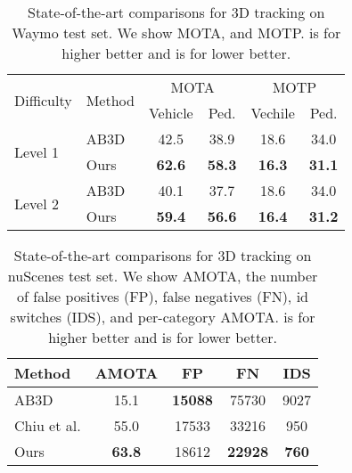 \documentclass[final]{cvpr}
\begin{document}
\begin{table}[t]
\small
\begin{center}
\begin{tabular}{@{}l@{\ \ \ }l@{\ \ \ }c@{\ \ \ }c@{\ \ \ }c@{\ \ \ }c@{}}
  \toprule
  \multirow{2}{4em}{Difficulty} & \multirow{2}{3em}{Method} &  \multicolumn{2}{c}{MOTA} & \multicolumn{2}{c}{MOTP} \\ 
  & & Vehicle & Ped. & Vechile & Ped.  \\ 
   \midrule 
   \multirow{2}{3em}{Level 1} 
   & AB3D~\cite{weng2019baseline, sun2019scalability} & 42.5  & 38.9 & 18.6 & 34.0  \\
   & Ours &  \textbf{62.6} & \textbf{58.3} & \textbf{16.3} & \textbf{31.1} \\ 
  \midrule 
  \multirow{2}{3em}{Level 2} 
  & AB3D~\cite{weng2019baseline, sun2019scalability} & 40.1 & 37.7 & 18.6 & 34.0  \\ 
  & Ours & \textbf{59.4} & \textbf{56.6} & \textbf{16.4} & \textbf{31.2} \\ 
  \bottomrule
\end{tabular}
\end{center}
\vspace{-5mm}
\caption{State-of-the-art comparisons for 3D tracking on Waymo test set. We show MOTA, and MOTP.  is for higher better and  is for lower better.}
\end{table}

\begin{table}[t]
\small
\begin{center}
\begin{tabular}{lcccc}
  \toprule
  Method & AMOTA & FP & FN & IDS\\
   \midrule 
  AB3D \cite{weng2019baseline} & 15.1 & \textbf{15088} & 75730 & 9027 \\
  Chiu et al. \cite{chiu2020probabilistic} & 55.0  & 17533 & 33216 & 950\\
  Ours & \textbf{63.8} & 18612 & \textbf{22928} & \textbf{760} \\ 
  \bottomrule
\end{tabular}
\end{center}
\vspace{-5mm}
\caption{State-of-the-art comparisons for 3D tracking on nuScenes test set. We show AMOTA, the number of false positives (FP), false negatives (FN), id switches (IDS), and per-category AMOTA.  is for higher better and  is for lower better.}
\end{table}
\end{document}
